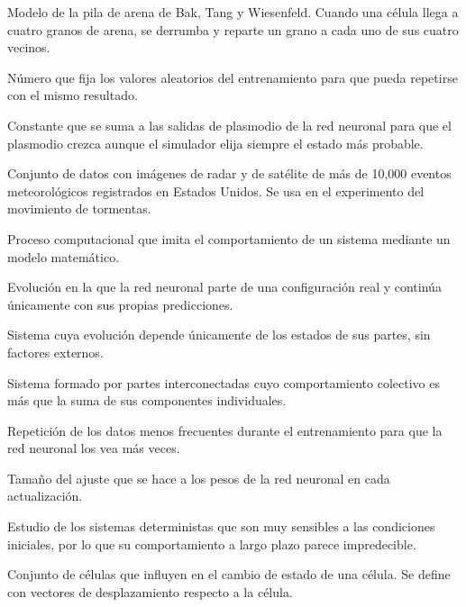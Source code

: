 \begin{description}[leftmargin=1.5em, labelindent=0pt, itemsep=4pt]
	\item[\textit{Sandpile}] Modelo de la pila de arena de Bak, Tang y Wiesenfeld. Cuando una célula llega a cuatro granos de arena, se derrumba y reparte un grano a cada uno de sus cuatro vecinos.

	\item[Semilla aleatoria] Número que fija los valores aleatorios del entrenamiento para que pueda repetirse con el mismo resultado.

	\item[Sesgo de crecimiento] Constante que se suma a las salidas de plasmodio de la red neuronal para que el plasmodio crezca aunque el simulador elija siempre el estado más probable.

	\item[SEVIR] Conjunto de datos con imágenes de radar y de satélite de más de 10,000 eventos meteorológicos registrados en Estados Unidos. Se usa en el experimento del movimiento de tormentas.

	\item[Simulación] Proceso computacional que imita el comportamiento de un sistema mediante un modelo matemático.

	\item[Simulación libre] Evolución en la que la red neuronal parte de una configuración real y continúa únicamente con sus propias predicciones.

	\item[Sistema cerrado] Sistema cuya evolución depende únicamente de los estados de sus partes, sin factores externos.

	\item[Sistema complejo] Sistema formado por partes interconectadas cuyo comportamiento colectivo es más que la suma de sus componentes individuales.

	\item[Sobremuestreo] Repetición de los datos menos frecuentes durante el entrenamiento para que la red neuronal los vea más veces.

	\item[Tasa de aprendizaje] Tamaño del ajuste que se hace a los pesos de la red neuronal en cada actualización.

	\item[Teoría del caos] Estudio de los sistemas deterministas que son muy sensibles a las condiciones iniciales, por lo que su comportamiento a largo plazo parece impredecible.

	\item[Vecindad] Conjunto de células que influyen en el cambio de estado de una célula. Se define con vectores de desplazamiento respecto a la célula.


\end{description}
